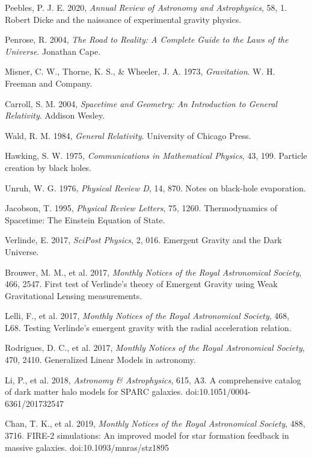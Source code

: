 \documentclass[12pt,a4paper]{article}
\begin{document}
\begin{thebibliography}{99}
 Peebles, P. J. E. 2020, \textit{Annual Review of Astronomy and Astrophysics}, 58, 1. Robert Dicke and the naissance of experimental gravity physics.

 Penrose, R. 2004, \textit{The Road to Reality: A Complete Guide to the Laws of the Universe}. Jonathan Cape.

 Misner, C. W., Thorne, K. S., \& Wheeler, J. A. 1973, \textit{Gravitation}. W. H. Freeman and Company.

 Carroll, S. M. 2004, \textit{Spacetime and Geometry: An Introduction to General Relativity}. Addison Wesley.

 Wald, R. M. 1984, \textit{General Relativity}. University of Chicago Press.

 Hawking, S. W. 1975, \textit{Communications in Mathematical Physics}, 43, 199. Particle creation by black holes.

 Unruh, W. G. 1976, \textit{Physical Review D}, 14, 870. Notes on black-hole evaporation.

 Jacobson, T. 1995, \textit{Physical Review Letters}, 75, 1260. Thermodynamics of Spacetime: The Einstein Equation of State.

 Verlinde, E. 2017, \textit{SciPost Physics}, 2, 016. Emergent Gravity and the Dark Universe.

 Brouwer, M. M., et al. 2017, \textit{Monthly Notices of the Royal Astronomical Society}, 466, 2547. First test of Verlinde's theory of Emergent Gravity using Weak Gravitational Lensing measurements.

 Lelli, F., et al. 2017, \textit{Monthly Notices of the Royal Astronomical Society}, 468, L68. Testing Verlinde's emergent gravity with the radial acceleration relation.

 Rodrigues, D. C., et al. 2017, \textit{Monthly Notices of the Royal Astronomical Society}, 470, 2410. Generalized Linear Models in astronomy.

 Li, P., et al. 2018, \textit{Astronomy \& Astrophysics}, 615, A3. A comprehensive catalog of dark matter halo models for SPARC galaxies. doi:10.1051/0004-6361/201732547

 Chan, T. K., et al. 2019, \textit{Monthly Notices of the Royal Astronomical Society}, 488, 3716. FIRE-2 simulations: An improved model for star formation feedback in massive galaxies. doi:10.1093/mnras/stz1895


\end{thebibliography}
\end{document}
